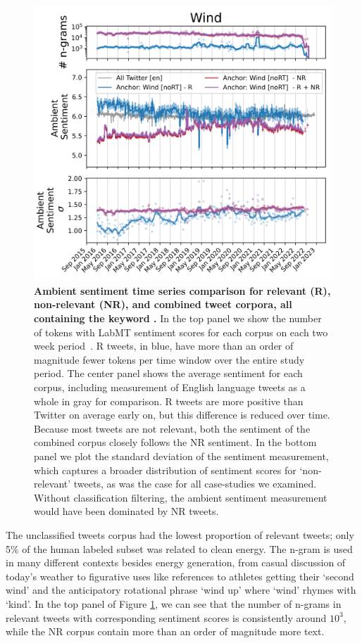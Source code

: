\begin{figure}[tp!]
  \centering	
    \includegraphics[width=0.98\columnwidth]{figures/Wind_sentiment_2016-01-01_2022-08-30.png}  
  \caption{
    \textbf{Ambient sentiment time series comparison for relevant  (R),
    non-relevant (NR), and combined tweet corpora,
    all containing the keyword .}
    In the top panel we show the number of tokens with LabMT
    sentiment scores for each corpus on each two week period~\cite{dodds2015human}.
    R tweets, in blue, have more than an order of magnitude fewer tokens per time window over the entire study period.
    The center panel shows the average sentiment for each corpus, including measurement of English language tweets as a whole in gray for comparison. 
    R  tweets are more positive than Twitter on average early on, but this difference is reduced over time. 
    Because most  tweets are not relevant, both the sentiment of the combined corpus closely follows the NR sentiment.
    In the bottom panel we plot the standard deviation of the sentiment measurement,
    which captures a broader distribution of sentiment scores for  `non-relevant' tweets,
    as was the case for all case-studies we examined.
    Without classification filtering, the ambient sentiment measurement would have been dominated by NR tweets. 
  }
  \label{fig:wind_sentiment}
\end{figure}
\todo{}
The unclassified  tweets corpus had the lowest proportion of relevant tweets;
only 5\% of the human labeled subset was related to clean energy.
The n-gram  is used in many different contexts besides energy generation,
from casual discussion of today's weather to figurative uses like references to athletes getting their `second wind' and the anticipatory rotational phrase `wind up' where `wind' rhymes with `kind'. In the top panel of Figure \ref{fig:wind_sentiment}, we can see that the number of n-grams in relevant tweets with corresponding sentiment scores is consistently around $10^3$, while the NR corpus contain more than an order of magnitude more text.

